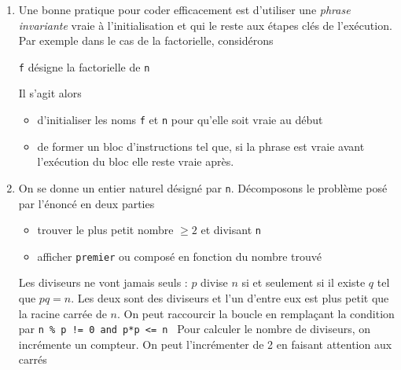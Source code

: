 \begin{enumerate}
  \item Une bonne pratique pour coder efficacement est d'utiliser une \emph{phrase invariante} vraie à l'initialisation et qui le reste aux étapes clés de l'exécution. Par exemple dans le cas de la factorielle, considérons 
\begin{center}
  \og \texttt{f} désigne la factorielle de \texttt{n} \fg
\end{center}
Il s'agit alors
\begin{itemize}
  \item d'initialiser les noms \texttt{f} et \texttt{n} pour qu'elle soit vraie au début
  \item de former un bloc d'instructions tel que, si la phrase est vraie avant l'exécution du bloc elle reste vraie après.
\end{itemize}


\item On se donne un entier naturel désigné par \texttt{n}. Décomposons le problème posé par l'énoncé en deux parties
\begin{itemize}
  \item trouver le plus petit nombre $\geq 2$ et divisant \texttt{n}
  \item afficher \texttt{premier} ou composé en fonction du nombre trouvé
\end{itemize}

Les diviseurs ne vont jamais seuls : $p$ divise $n$ si et seulement si il existe $q$ tel que $pq=n$. Les deux sont des diviseurs et l'un d'entre eux est plus petit que la racine carrée de $n$. 
On peut raccourcir la boucle en remplaçant la condition par \texttt{n \% p != 0 and p*p <= n }\newline
Pour calculer le nombre de diviseurs, on incrémente un compteur. On peut l'incrémenter de 2 en faisant attention aux carrés



\end{enumerate}
